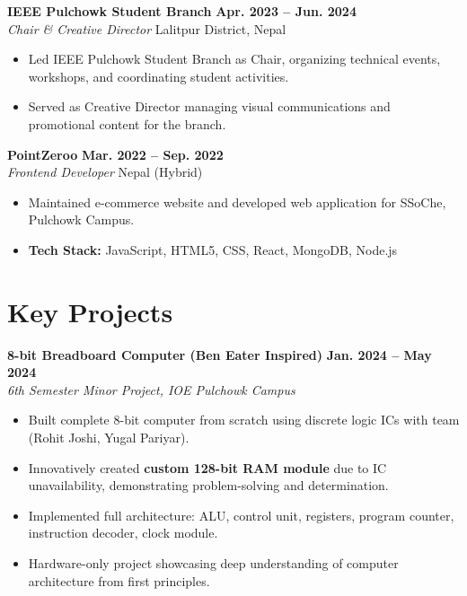\documentclass[11pt,a4paper]{article}
\begin{document}
\textbf{IEEE Pulchowk Student Branch} \hfill \textbf{Apr. 2023 -- Jun. 2024}\\
\textit{Chair \& Creative Director} \hfill Lalitpur District, Nepal\\[-6pt]
\begin{itemize}[leftmargin=*, itemsep=2pt, topsep=4pt]
    \item Led IEEE Pulchowk Student Branch as Chair, organizing technical events, workshops, and coordinating student activities.
    \item Served as Creative Director managing visual communications and promotional content for the branch.
\end{itemize}

\textbf{PointZeroo} \hfill \textbf{Mar. 2022 -- Sep. 2022}\\
\textit{Frontend Developer} \hfill Nepal (Hybrid)\\[-6pt]
\begin{itemize}[leftmargin=*, itemsep=2pt, topsep=4pt]
    \item Maintained e-commerce website and developed web application for SSoChe, Pulchowk Campus.
    \item \textbf{Tech Stack:} JavaScript, HTML5, CSS, React, MongoDB, Node.js
\end{itemize}

\section*{Key Projects}

\textbf{8-bit Breadboard Computer (Ben Eater Inspired)} \hfill \textbf{Jan. 2024 -- May 2024}\\
\textit{6th Semester Minor Project, IOE Pulchowk Campus}\\[-6pt]
\begin{itemize}[leftmargin=*, itemsep=2pt, topsep=4pt]
    \item Built complete 8-bit computer from scratch using discrete logic ICs with team (Rohit Joshi, Yugal Pariyar).
    \item Innovatively created \textbf{custom 128-bit RAM module} due to IC unavailability, demonstrating problem-solving and determination.
    \item Implemented full architecture: ALU, control unit, registers, program counter, instruction decoder, clock module.
    \item Hardware-only project showcasing deep understanding of computer architecture from first principles.
\end{itemize}
\end{document}
